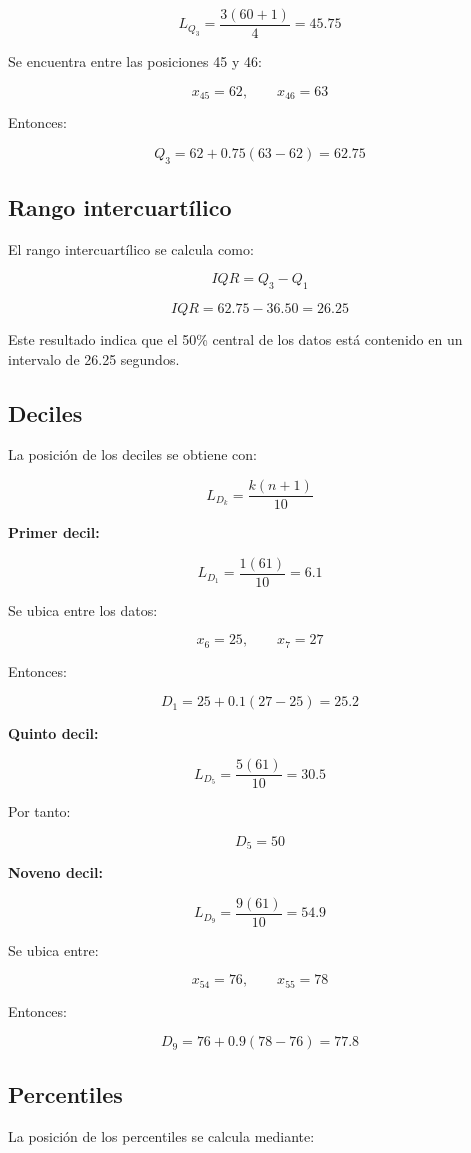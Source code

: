 \documentclass[12pt,letterpaper]{article}
\begin{document}
\[
L_{Q_3}=\frac{3(60+1)}{4}=45.75
\]

Se encuentra entre las posiciones 45 y 46:

\[
x_{45}=62,\qquad x_{46}=63
\]

Entonces:

\[
Q_3=62+0.75(63-62)=62.75
\]

\subsection{Rango intercuartílico}

El rango intercuartílico se calcula como:

\[
IQR=Q_3-Q_1
\]

\[
IQR=62.75-36.50=26.25
\]

Este resultado indica que el 50\% central de los datos está contenido en un intervalo de 26.25 segundos.

\subsection{Deciles}

La posición de los deciles se obtiene con:

\[
L_{D_k}=\frac{k(n+1)}{10}
\]

\textbf{Primer decil:}

\[
L_{D_1}=\frac{1(61)}{10}=6.1
\]

Se ubica entre los datos:

\[
x_6=25,\qquad x_7=27
\]

Entonces:

\[
D_1=25+0.1(27-25)=25.2
\]

\textbf{Quinto decil:}

\[
L_{D_5}=\frac{5(61)}{10}=30.5
\]

Por tanto:

\[
D_5=50
\]

\textbf{Noveno decil:}

\[
L_{D_9}=\frac{9(61)}{10}=54.9
\]

Se ubica entre:

\[
x_{54}=76,\qquad x_{55}=78
\]

Entonces:

\[
D_9=76+0.9(78-76)=77.8
\]

\subsection{Percentiles}

La posición de los percentiles se calcula mediante:
\end{document}
